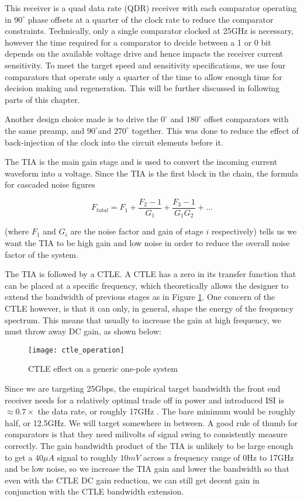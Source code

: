 This receiver is a quad data rate (QDR) receiver with each comparator operating in $90^\circ$ phase offsets at a quarter of the clock rate to reduce the comparator constraints. Technically, only a single comparator clocked at 25GHz is necessary, however the time required for a comparator to decide between a 1 or 0 bit depends on the available voltage drive and hence impacts the receiver current sensitivity. To meet the target speed and sensitivity specifications, we use four comparators that operate only a quarter of the time to allow enough time for decision making and regeneration. This will be further discussed in following parts of this chapter.

Another design choice made is to drive the $0^\circ$ and $180^\circ$ offset comparators with the same preamp, and $90^\circ$and $270^\circ$ together. This was done to reduce the effect of back-injection of the clock into the circuit elements before it.

The TIA is the main gain stage and is used to convert the incoming current waveform into a voltage. Since the TIA is the first block in the chain, the formula for cascaded noise figures

\begin{equation}
\label{friis}
F_{total}=F_1+\frac{F_2-1}{G_1}+\frac{F_3-1}{G_1G_2}+...
\end{equation}

(where $F_1$ and $G_i$ are the noise factor and gain of stage $i$ respectively) tells us we want the TIA to be high gain and low noise in order to reduce the overall noise factor of the system.

The TIA is followed by a CTLE. A CTLE has a zero in its transfer function that can be placed at a specific frequency, which theoretically allows the designer to extend the bandwidth of previous stages as in Figure \ref{fig:CTLE Operation}. One concern of the CTLE however, is that it can only, in general, shape the energy of the frequency spectrum. This means that usually to increase the gain at high frequency, we must throw away DC gain, as shown below:

\begin{figure}[h]
\centering
\texttt{[image: ctle\_operation]}
\caption{CTLE effect on a generic one-pole system}
\label{fig:CTLE Operation}
\end{figure}

Since we are targeting 25Gbps, the empirical target bandwidth the front end receiver needs for a relatively optimal trade off in power and introduced ISI is $\approx 0.7\times$ the data rate, or roughly 17GHz \cite{settaluri_first_2017}. The bare minimum would be roughly half, or 12.5GHz. We will target somewhere in between. A good rule of thumb for comparators is that they need milivolts of signal swing to consistently measure correctly. The gain bandwidth product of the TIA is unlikely to be large enough to get a $40\mu A$ signal to roughly $10mV$ across a frequency range of 0Hz to 17GHz and be low noise, so we increase the TIA gain and lower the bandwidth so that even with the CTLE DC gain reduction, we can still get decent gain in conjunction with the CTLE bandwidth extension. 

